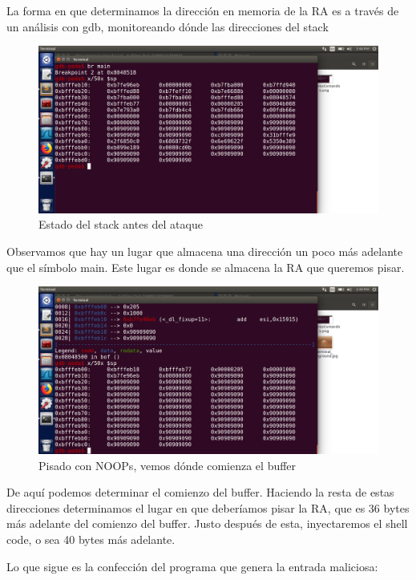 \documentclass[12pt]{article}
\begin{document}
La forma en que determinamos la dirección en memoria de la RA es a través de un análisis con gdb, monitoreando dónde las direcciones del stack

\begin{figure}[!h]
    \centering
    \includegraphics[width=0.9\linewidth]{StackSinAtacar.png}
    \caption{Estado del stack antes del ataque}
    \label{fig:enter-label}
\end{figure}

Observamos que hay un lugar que almacena una dirección un poco más adelante que el símbolo main. Este lugar es donde se almacena la RA que queremos pisar.

\begin{figure}[h!]
    \centering
    \includegraphics[width=0.9\linewidth]{Nops.png}
    \caption{Pisado con NOOPs, vemos dónde comienza el buffer}
    \label{fig:enter-label}
\end{figure}

De aquí podemos determinar el comienzo del buffer. Haciendo la resta de estas direcciones determinamos el lugar en que deberíamos pisar la RA, que es 36 bytes más adelante del comienzo del buffer. Justo después de esta, inyectaremos el shell code, o sea 40 bytes más adelante.

Lo que sigue es la confección del programa que genera la entrada maliciosa:
\end{document}
